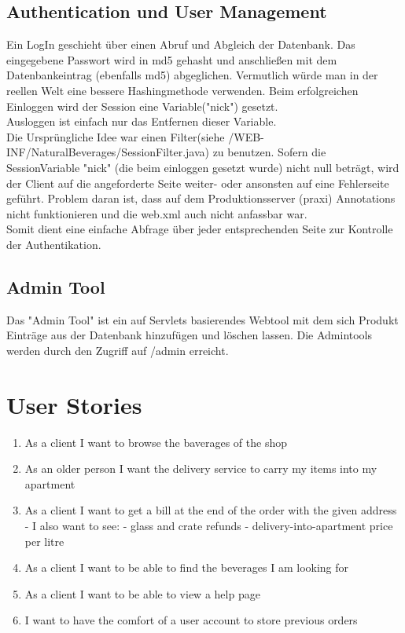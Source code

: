 \documentclass[a4paper, 11pt]{article}
\begin{document}
\subsection{Authentication und User Management}
Ein LogIn geschieht über einen Abruf und Abgleich der Datenbank. Das eingegebene Passwort wird in md5 gehasht und anschließen mit dem Datenbankeintrag (ebenfalls md5) abgeglichen. Vermutlich würde man in der reellen Welt eine bessere Hashingmethode verwenden. Beim erfolgreichen Einloggen wird der Session eine Variable("nick") gesetzt. \\
Ausloggen ist einfach nur das Entfernen dieser Variable.\\
Die Ursprüngliche Idee war einen Filter(siehe /WEB-INF/NaturalBeverages/SessionFilter.java) zu benutzen. Sofern die SessionVariable "nick" (die beim einloggen gesetzt wurde) nicht null beträgt, wird der Client auf die angeforderte Seite weiter- oder ansonsten auf eine Fehlerseite geführt. Problem daran ist, dass auf dem Produktionsserver (praxi) Annotations nicht funktionieren und die web.xml auch nicht anfassbar war. \\
Somit dient eine einfache Abfrage über jeder entsprechenden Seite zur Kontrolle der Authentikation.  

\subsection{Admin Tool}
Das "Admin Tool" ist ein auf Servlets basierendes Webtool mit dem sich Produkt Einträge aus der Datenbank hinzufügen und löschen lassen. Die Admintools werden durch den Zugriff auf /admin erreicht. 

\section{User Stories}
\begin{enumerate}
	\item As a client I want to browse the baverages of the shop
	\item As an older person I want the delivery service to carry my items into my apartment
	\item As a client I want to get a bill at the end of the order with the given address
		- I also want to see:
			- glass and crate refunds
			- delivery-into-apartment price per litre
	\item As a client I want to be able to find the beverages I am looking for
	\item As a client I want to be able to view a help page
	\item I want to have the comfort of a user account to store previous orders
	\end{enumerate}
\end{document}
